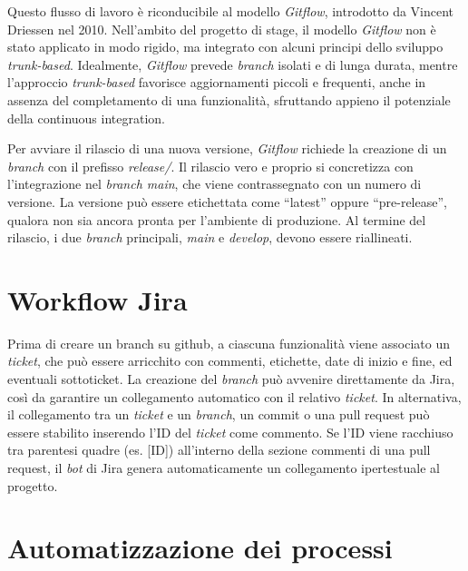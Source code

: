 \vspace{10pt}
\par\noindent Questo flusso di lavoro è riconducibile al modello \textit{Gitflow}, introdotto da Vincent Driessen nel 2010. Nell’ambito del progetto di stage, il modello \textit{Gitflow} non è stato applicato in modo rigido, ma integrato con alcuni principi dello sviluppo \textit{trunk-based}. Idealmente, \textit{Gitflow} prevede \textit{branch} isolati e di lunga durata, mentre l’approccio \textit{trunk-based} favorisce aggiornamenti piccoli e frequenti, anche in assenza del completamento di una funzionalità, sfruttando appieno il potenziale della \gls{continuous integration}.

\vspace{10pt}
\par\noindent Per avviare il rilascio di una nuova versione, \textit{Gitflow} richiede la creazione di un \textit{branch} con il prefisso \textit{release/}. Il rilascio vero e proprio si concretizza con l’integrazione nel \textit{branch main}, che viene contrassegnato con un numero di versione. La versione può essere etichettata come “latest” oppure “pre-release”, qualora non sia ancora pronta per l’ambiente di produzione. Al termine del rilascio, i due \textit{branch} principali, \textit{main} e \textit{develop}, devono essere riallineati.

\section{Workflow Jira}

\par Prima di creare un branch su \gls{github}, a ciascuna funzionalità viene associato un \textit{ticket}, che può essere arricchito con commenti, etichette, date di inizio e fine, ed eventuali sottoticket. La creazione del \textit{branch} può avvenire direttamente da Jira, così da garantire un collegamento automatico con il relativo \textit{ticket}. In alternativa, il collegamento tra un \textit{ticket} e un \textit{branch}, un \gls{commit} o una \gls{pull request} può essere stabilito inserendo l’ID del \textit{ticket} come commento. Se l’ID viene racchiuso tra parentesi quadre (es. [ID]) all’interno della sezione commenti di una \gls{pull request}, il \textit{bot} di Jira genera automaticamente un collegamento ipertestuale al progetto.

\section{Automatizzazione dei processi}

